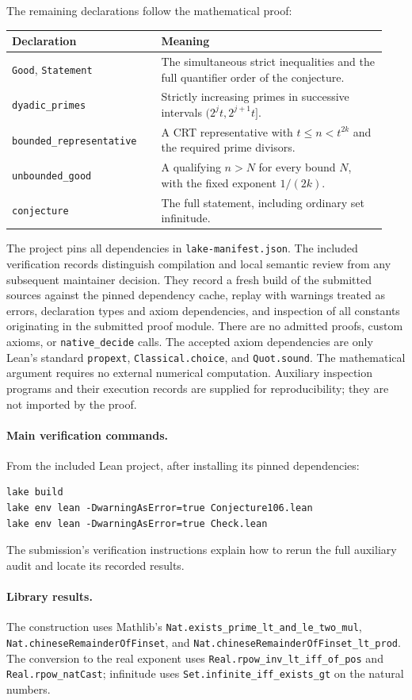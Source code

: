 \documentclass[11pt]{article}
\begin{document}
\noindent The remaining declarations follow the mathematical proof:
\begin{center}
\begin{tabular}{@{}>{\raggedright\arraybackslash}p{0.37\linewidth}
                    >{\raggedright\arraybackslash}p{0.57\linewidth}@{}}
\toprule
Declaration & Meaning \\
\midrule
\texttt{Good}, \texttt{Statement} & The simultaneous strict inequalities
and the full quantifier order of the conjecture. \\
\texttt{dyadic\_primes} & Strictly increasing primes in successive intervals
$(2^j t,2^{j+1}t]$. \\
\texttt{bounded\_representative} & A CRT representative with
$t\le n<t^{2k}$ and the required prime divisors. \\
\texttt{unbounded\_good} & A qualifying $n>N$ for every bound $N$,
with the fixed exponent $1/(2k)$. \\
\texttt{conjecture} & The full statement, including ordinary set infinitude. \\
\bottomrule
\end{tabular}
\end{center}

The project pins all dependencies in \texttt{lake-manifest.json}.
The included verification records distinguish compilation and local semantic
review from any subsequent maintainer decision. They record a fresh build
of the submitted sources against the pinned dependency cache, replay with
warnings treated as errors, declaration types and axiom dependencies, and
inspection of all constants originating in the submitted proof module.
There are no admitted proofs, custom axioms, or \texttt{native\_decide} calls.
The accepted axiom dependencies are only Lean's standard
\texttt{propext}, \texttt{Classical.choice}, and \texttt{Quot.sound}.
The mathematical argument requires no external numerical computation.
Auxiliary inspection programs and their execution records are supplied for
reproducibility; they are not imported by the proof.

\paragraph{Main verification commands.}
From the included Lean project, after installing its pinned dependencies:
\begin{verbatim}
lake build
lake env lean -DwarningAsError=true Conjecture106.lean
lake env lean -DwarningAsError=true Check.lean
\end{verbatim}
The submission's verification instructions explain how to rerun the full
auxiliary audit and locate its recorded results.

\paragraph{Library results.}
The construction uses Mathlib's
\texttt{Nat.exists\_prime\_lt\_and\_le\_two\_mul},
\texttt{Nat.chineseRemainderOfFinset}, and
\texttt{Nat.chineseRemainderOfFinset\_lt\_prod}.
The conversion to the real exponent uses
\texttt{Real.rpow\_inv\_lt\_iff\_of\_pos} and
\texttt{Real.rpow\_natCast}; infinitude uses
\texttt{Set.infinite\_iff\_exists\_gt} on the natural numbers.
\end{document}
